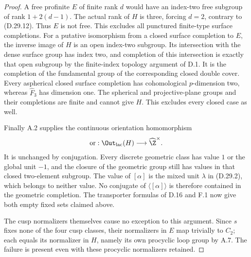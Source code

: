 \begin{proof}
A free profinite $E$ of finite rank $d$ would have an
index-two free subgroup of rank $1+2(d-1)$.  The actual
rank of $H$ is three, forcing $d=2$, contrary to
(D.29.12).  Thus $E$ is not free.  This excludes all
punctured finite-type surface completions.
For a putative isomorphism from a closed surface
completion to $E$, the inverse image of $H$ is an open
index-two subgroup.  Its intersection with the dense
surface group has index two, and completion of this
intersection is exactly that open subgroup by the
finite-index topology argument of D.1.  It is the
completion of the fundamental group of the corresponding
closed double cover.  Every aspherical closed surface
completion has cohomological $p$-dimension two, whereas
$\widehat F_3$ has dimension one.  The spherical and
projective-plane groups and their completions are finite
and cannot give $H$.  This excludes every closed case
as well.

Finally A.2 supplies the continuous orientation
homomorphism
\[
 \operatorname{or}:\Out_{\rm lac}(H)
                       \longrightarrow\widehat\Z^\times.
\]
It is unchanged by conjugation.  Every discrete geometric
class has value $1$ or the global unit $-1$, and the
closure of the geometric group still has values in that
closed two-element subgroup.  The value of $[\alpha]$
is the mixed unit $\lambda$ in (D.29.2), which belongs
to neither value.  No conjugate of $\langle[\alpha]\rangle$
is therefore contained in the geometric completion.
The transporter formulas of D.16 and F.1 now give both
empty fixed sets claimed above.

The cusp normalizers themselves cause no exception to
this argument.  Since $s$ fixes none of the four cusp
classes, their normalizers in $E$ map trivially to $C_2$;
each equals its normalizer in $H$, namely its own
procyclic loop group by A.7.  The failure is present
even with these procyclic normalizers retained.
\end{proof}
